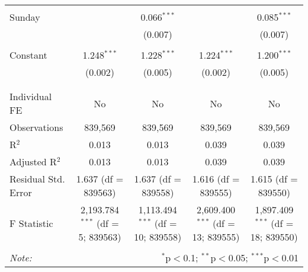 \documentclass[
]{article}
\begin{document}
\begin{table}[!htbp]
{\begin{tabular}{@{\extracolsep{5pt}}lcccc}
  & & & & \\ 
 Sunday &  & 0.066$^{***}$ &  & 0.085$^{***}$ \\ 
  &  & (0.007) &  & (0.007) \\ 
  & & & & \\ 
 Constant & 1.248$^{***}$ & 1.228$^{***}$ & 1.224$^{***}$ & 1.200$^{***}$ \\ 
  & (0.002) & (0.005) & (0.002) & (0.005) \\ 
  & & & & \\ 
\hline \\[-1.8ex] 
Individual FE & No & No & No & No \\ 
Observations & 839,569 & 839,569 & 839,569 & 839,569 \\ 
R$^{2}$ & 0.013 & 0.013 & 0.039 & 0.039 \\ 
Adjusted R$^{2}$ & 0.013 & 0.013 & 0.039 & 0.039 \\ 
Residual Std. Error & 1.637 (df = 839563) & 1.637 (df = 839558) & 1.616 (df = 839555) & 1.615 (df = 839550) \\ 
F Statistic & 2,193.784$^{***}$ (df = 5; 839563) & 1,113.494$^{***}$ (df = 10; 839558) & 2,609.400$^{***}$ (df = 13; 839555) & 1,897.409$^{***}$ (df = 18; 839550) \\ 
\hline 
\hline \\[-1.8ex] 
\textit{Note:}  & \multicolumn{4}{r}{$^{*}$p$<$0.1; $^{**}$p$<$0.05; $^{***}$p$<$0.01} \\ 
\end{tabular}
} 
\end{table} 
\newpage
\end{document}
